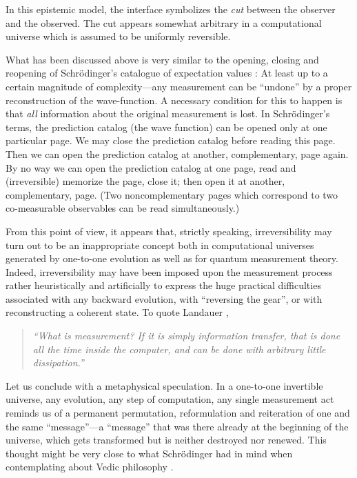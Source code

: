 \documentclass[pra,amsfonts,twocolumn]{revtex4}
\begin{document}
In this epistemic model, the interface symbolizes the {\em cut} between
the observer and the observed. The cut appears somewhat arbitrary in a
computational universe which is assumed to be uniformly reversible.

What has been discussed above is very similar to the
opening,
closing and reopening of Schr\"odinger's catalogue of expectation values
\cite[p. 53]{schrodinger}:
At least up to
a certain magnitude of complexity---any measurement can be ``undone'' by
a proper reconstruction of the wave-function. A necessary condition for
this to happen is that {\em all} information about the original
measurement is lost.
In Schr\"odinger's terms,
the prediction catalog
(the wave function) can be opened only at one particular page.
We may close
the prediction catalog
before reading this page. Then we can open
the prediction catalog
at another, complementary, page again.
By no way we can open
the prediction catalog at one page, read and (irreversible) memorize the
page, close it; then open it at another, complementary, page.
(Two noncomplementary pages which correspond to two co-measurable
observables can be read simultaneously.)



From this point of view, it appears that, strictly speaking,
irreversibility
may turn out to be an inappropriate concept both in computational
universes generated by one-to-one evolution as well as for quantum
measurement theory. Indeed, irreversibility may have been imposed upon
the measurement process
rather heuristically and artificially to express the huge practical
difficulties associated with any
backward evolution, with ``reversing the gear'', or with reconstructing
a coherent state.
 To quote Landauer
\cite[section 2]{landauer-89},
 \begin{quote}
{\em ``What is measurement? If it is simply information transfer, that
is done all the time inside the computer, and can be done with arbitrary
little dissipation.''}
 \end{quote}

Let us conclude with a metaphysical speculation.
In a one-to-one invertible universe, any  evolution, any step of
computation, any single measurement
act reminds us of a permanent permutation, reformulation and reiteration
of one
and the same ``message''---a ``message'' that was there already at the
beginning of the universe, which gets transformed but is neither
destroyed nor renewed. This thought might be very close to what
Schr\"odinger had in mind when contemplating about Vedic philosophy
\cite{schroed:welt}.
\end{document}
